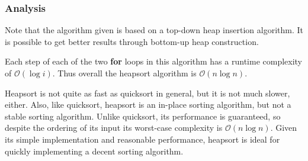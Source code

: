 \documentclass[12pt]{article}
\begin{document}
\subsubsection*{Analysis}

Note that the algorithm given is based on a top-down heap insertion algorithm.
It is possible to get better results through bottom-up heap construction.

Each step of each of the two \textbf{for} loops in this algorithm has a runtime complexity of $\mathcal{O}(\log i)$.  Thus overall the heapsort algorithm is $\mathcal{O}(n\log n)$.

Heapsort is not quite as fast as quicksort in general, but it is not much slower, either.  Also, like quicksort, heapsort is an in-place sorting algorithm, but not a stable sorting algorithm.
Unlike quicksort, its performance is guaranteed, so despite the ordering of its input its worst-case complexity is $\mathcal{O}(n\log n)$.
Given its simple implementation and reasonable performance, heapsort is ideal for quickly implementing a decent sorting algorithm.
\end{document}
